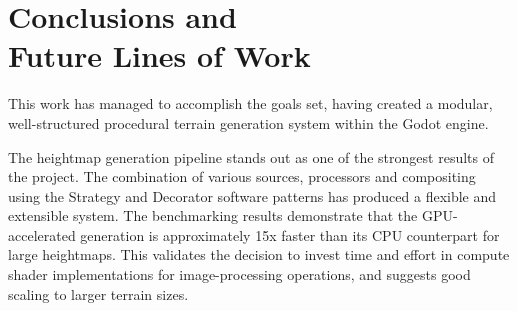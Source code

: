 
\chapter{Conclusions and \\ Future Lines of Work} \label{chap:Conclusions} 

This work has managed to accomplish the goals set, having created a modular, well-structured procedural terrain generation system within the Godot engine.

The heightmap generation pipeline stands out as one of the strongest results of the project.
The combination of various sources, processors and compositing using the Strategy and Decorator software patterns has produced a flexible and extensible system.
The benchmarking results demonstrate that the GPU-accelerated generation is approximately 15x faster than its CPU counterpart for large heightmaps.
This validates the decision to invest time and effort in compute shader implementations for image-processing operations, and suggests good scaling to larger terrain sizes.

